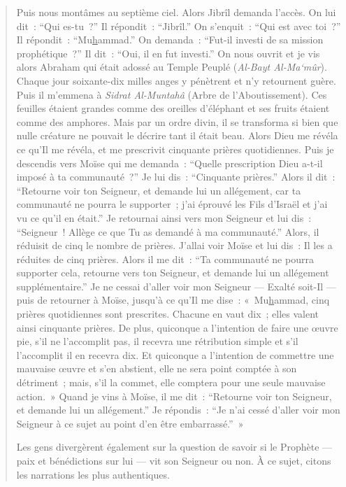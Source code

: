\begin{quote}
Puis nous montâmes au septième ciel. Alors Jibrîl demanda l'accès. On
lui dit~: ``Qui es-tu~?'' Il répondit~: ``Jibrîl.'' On s'enquit~: ``Qui
est avec toi~?'' Il répondit~: ``Mu\underline{h}ammad.'' On demanda~:
``Fut-il investi de sa mission prophétique~?'' Il dit~: ``Oui, il en fut
investi.'' On nous ouvrit et je vis alors Abraham qui était adossé au
Temple Peuplé (\emph{Al-Bayt Al-Ma`mûr}). Chaque jour soixante-dix
milles anges y pénètrent et n'y retournent guère. Puis il m'emmena à
\emph{Sidrat Al-Muntahâ} (Arbre de l'Aboutissement). Ces feuilles
étaient grandes comme des oreilles d'éléphant et ses fruits étaient
comme des amphores. Mais par un ordre divin, il se transforma si bien
que nulle créature ne pouvait le décrire tant il était beau. Alors Dieu
me révéla ce qu'Il me révéla, et me prescrivit cinquante prières
quotidiennes. Puis je descendis vers Moïse qui me demanda~: ``Quelle
prescription Dieu a-t-il imposé à ta communauté~?'' Je lui dis~:
``Cinquante prières.'' Alors il dit~: ``Retourne voir ton Seigneur, et
demande lui un allégement, car ta communauté ne pourra le supporter~;
j'ai éprouvé les Fils d'Israël et j'ai vu ce qu'il en était.'' Je
retournai ainsi vers mon Seigneur et lui dis~: ``Seigneur~! Allège ce
que Tu as demandé à ma communauté.'' Alors, il réduisit de cinq le
nombre de prières. J'allai voir Moïse et lui dis~: Il les a réduites de
cinq prières. Alors il me dit~: ``Ta communauté ne pourra supporter
cela, retourne vers ton Seigneur, et demande lui un allégement
supplémentaire.'' Je ne cessai d'aller voir mon Seigneur --- Exalté
soit-Il --- puis de retourner à Moïse, jusqu'à ce qu'Il me dise~:
«~Mu\underline{h}ammad, cinq prières quotidiennes sont prescrites.
Chacune en vaut dix~; elles valent ainsi cinquante prières. De plus,
quiconque a l'intention de faire une œuvre pie, s'il ne l'accomplit pas,
il recevra une rétribution simple et s'il l'accomplit il en recevra dix.
Et quiconque a l'intention de commettre une mauvaise œuvre et s'en
abstient, elle ne sera point comptée à son détriment~; mais, s'il la
commet, elle comptera pour une seule mauvaise action.~» Quand je vins à
Moïse, il me dit~: ``Retourne voir ton Seigneur, et demande lui un
allégement.'' Je répondis~: ``Je n'ai cessé d'aller voir mon Seigneur à
ce sujet au point d'en être
embarrassé.''~»

Les gens divergèrent également sur la question de savoir si le Prophète
--- paix et bénédictions sur lui --- vit son Seigneur ou non. À ce
sujet, citons les narrations les plus authentiques.
\end{quote}


